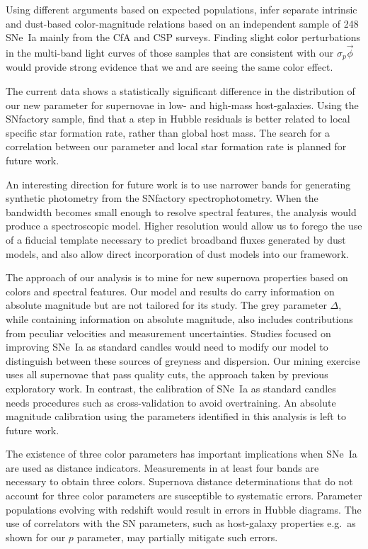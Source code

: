 \documentclass[trackchanges]{aastex62}   	%
\begin{document}
Using different arguments based on expected populations,  infer
separate intrinsic and dust-based color-magnitude relations based on an independent sample of 248 SNe~Ia
mainly from the CfA \citep{1999AJ....117..707R, 2006AJ....131..527J, 2009ApJ...700.1097H, 2012ApJS..200...12H}
and CSP \citep{2010AJ....139..519C, 2011AJ....142..156S} surveys.
Finding slight color perturbations in the multi-band light curves 
of those samples that are  consistent with our $\sigma_p \vec{\phi}$ would provide strong evidence 
that we and    are seeing the same color effect.

The current data shows a statistically significant difference in the distribution of our new parameter for supernovae
in low- and high-mass host-galaxies.
Using the SNfactory sample,
\citet{2018arXiv180603849R} find that a step in Hubble residuals is better related to local 
specific
star 
formation rate, rather than
global host mass.  The search for a correlation between our parameter and local star formation rate is planned for future work.

An interesting direction for future work is to use narrower bands for generating synthetic photometry
from the SNfactory spectrophotometry.  When the bandwidth becomes small enough
to resolve spectral features, the analysis would produce a spectroscopic model.   Higher resolution would allow us to forego 
the use of a fiducial template necessary to predict broadband fluxes generated by dust models, and also allow direct incorporation
of dust models into our framework.


The approach of our analysis is to mine for new supernova properties based on colors and spectral features.
Our model and results do carry information on absolute magnitude but are not tailored for its study.
The grey parameter $\Delta$, while containing information on absolute magnitude, 
also 
includes
contributions from peculiar velocities and measurement uncertainties.  Studies
focused on improving SNe~Ia as standard candles 
would need to
modify  our model to
distinguish between these sources of greyness and dispersion.
Our
mining exercise uses all supernovae that pass quality cuts, the approach taken by previous
exploratory work.  In contrast, the calibration of SNe~Ia as standard candles needs procedures such
as cross-validation to avoid overtraining.
An absolute magnitude calibration using the parameters identified in this analysis is left to future work.

The existence of three color parameters  has important implications when SNe~Ia are used as distance indicators.
Measurements in at least four bands are necessary to obtain three colors.  
Supernova distance determinations that do not account for three color parameters are susceptible to 
systematic errors.  
Parameter populations evolving with redshift would result in errors in
Hubble diagrams.
The use of  correlators with the SN parameters, such as host-galaxy properties e.g.\ as shown for our $p$ parameter,
may partially mitigate such errors.
\end{document}
